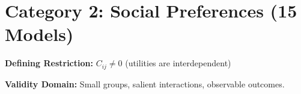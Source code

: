 \section{Category 2: Social Preferences (15 Models)}
\label{sec:ms-social}

\begin{tcolorbox}[colback=gray!5!white, colframe=gray!75!black,
    title=\textbf{Social Preferences: The Interdependence Extension}]

\textbf{Defining Restriction:} $C_{ij} \neq 0$ (utilities are interdependent)

\textbf{Validity Domain:} Small groups, salient interactions,
observable outcomes.

\end{tcolorbox}

